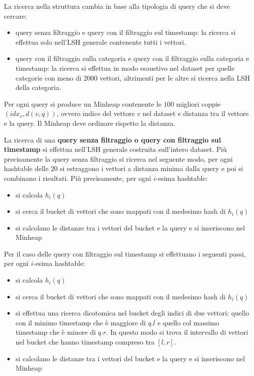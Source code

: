 La ricerca nella struttura cambia in base alla tipologia di query che si deve 
cercare:
\begin{itemize}
    \item query senza filtraggio e query con il filtraggio sul timestamp: la ricerca 
    si effettua solo nell'LSH generale contenente tutti i vettori.
    \item query con il filtraggio sulla categoria e query con il filtraggio sulla 
    categoria e timestamp: la ricerca si effettua in modo esaustivo nel dataset per quelle 
    categorie con meno di $2000$ vettori, altrimenti per le altre si ricerca 
    nella LSH della categoria. 
\end{itemize}

Per ogni query si produce un Minheap contenente le $100$ migliori coppie 
$(idx_v, d(v,q))$, ovvero indice del vettore $v$ nel dataset e distanza tra il vettore
e la query. Il Minheap deve ordinare rispetto la distanza.

La ricerca di una \textbf{query senza filtraggio o query con filtraggio sul timestamp} 
si effettua nell'LSH generale costruita sull'intero dataset. Più precisamente la 
query senza filtraggio si ricerca nel seguente modo, per ogni hashtable 
delle $20$ si estraggono i vettori a distanza minima dalla query e poi si combinano 
i risultati. Più precisamente, per ogni $i$-esima hashtable:
\begin{itemize}
    \item si calcola $h_i(q)$
    \item si cerca il bucket di vettori che sono mappati con il medesimo hash 
    di $h_i(q)$
    \item si calcolano le distanze tra i vettori del bucket e la query e si inseriscono
    nel Minheap
\end{itemize}
Per il caso delle query con filtraggio sul timestamp si effettuano i seguenti passi,
per ogni $i$-esima hashtable:
\begin{itemize}
    \item si calcola $h_i(q)$
    \item si cerca il bucket di vettori che sono mappati con il medesimo hash 
    di $h_i(q)$
    \item si effettua una ricerca dicotomica nel bucket degli indici di due vettori: quello con 
    il minimo timestamp che è maggiore di $q.l$ e quello col massimo timestamp che 
    è minore di $q.r$. In questo modo si trova il intervallo di vettori nel bucket 
    che hanno timestamp compreso tra $[l,r]$.
    \item si calcolano le distanze tra i vettori del bucket e la query e si inseriscono
    nel Minheap
\end{itemize}

